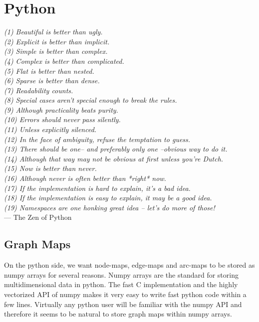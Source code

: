 \section{Python}\label{sec:graph_lib_python}

\begin{flushright}{\slshape    
(1) Beautiful is better than ugly. \\ \label{cit:line_a}
(2) Explicit is better than implicit. \\ \label{cit:line_b}
(3) Simple is better than complex. \\
(4) Complex is better than complicated. \\
(5) Flat is better than nested. \\
(6) Sparse is better than dense. \\
(7) Readability counts. \\
(8) Special cases aren't special enough to break the rules. \\
(9) Although practicality beats purity. \\
(10) Errors should never pass silently. \\
(11) Unless explicitly silenced. \\
(12) In the face of ambiguity, refuse the temptation to guess. \\
(13) There should be one-- and preferably only one --obvious way to do it. \\
(14) Although that way may not be obvious at first unless you're Dutch. \\
(15) Now is better than never. \\
(16) Although never is often better than *right* now. \\
(17) If the implementation is hard to explain, it's a bad idea. \\
(18) If the implementation is easy to explain, it may be a good idea. \\
(19) Namespaces are one honking great idea -- let's do more of those! } \\ \medskip
--- The Zen of Python
\end{flushright}
\label{fig:zen_of_python}


\subsection{Graph Maps}

On the python side, we want node-maps, edge-maps and arc-maps to be stored 
as numpy arrays for several reasons.
Numpy arrays are the standard for storing multidimensional data in python.
The fast C implementation and the highly vectorized API of numpy makes it very easy to write 
fast python code within a few lines.
Virtually any python user will be familiar with the numpy API and therefore it 
seems to be natural to store graph maps within numpy arrays.

